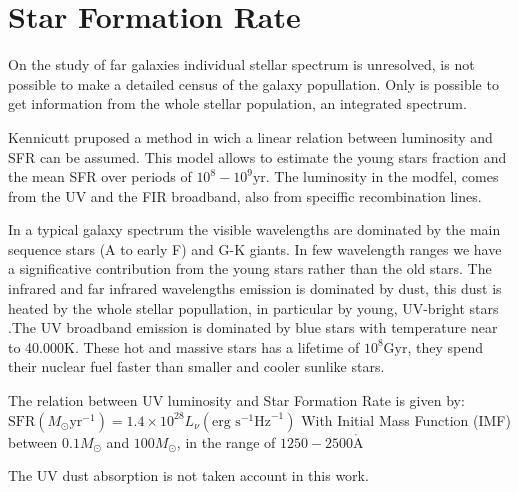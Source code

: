 \section{Star Formation Rate}

On the study of far galaxies individual stellar spectrum is unresolved, is not 
possible to make a detailed census of the galaxy popullation. Only is possible 
to get information from the whole stellar population, an integrated spectrum.

Kennicutt pruposed a method in wich a linear relation between luminosity and 
SFR can be assumed. This model allows to estimate the young stars fraction and 
the mean SFR over periods of $10^8 - 10^9 \textrm{yr}$. The luminosity in the 
modfel, comes from the UV and the FIR broadband, also from speciffic 
recombination lines. 

In a typical galaxy spectrum the visible wavelengths are dominated by the main 
sequence stars (A to early F) and G-K giants. In few wavelength ranges we have 
a significative contribution from the young stars rather than the old stars. 
The infrared and far infrared wavelengths emission is dominated by dust, this 
dust is  heated by the whole stellar popullation, in particular by young, 
UV-bright stars \citep{law11}.The UV broadband emission is dominated by blue 
stars with temperature near to 40.000K. These hot and massive stars has a 
lifetime of $10^8\textrm{Gyr}$, they spend their nuclear fuel faster than smaller 
and cooler sunlike stars.

The relation between UV luminosity and Star Formation Rate \citep{kennicutt98} 
is given by:
  $ \textrm{SFR}\left(M_\odot \textrm{yr}^{-1}\right) 
      = 1.4 \times 10^{28} L_{\nu} \left( \textrm{erg s}^{-1}\textrm{Hz}^{-1} 
\right)$
  With Initial Mass Function (IMF) between $0.1 M_\odot$ 
  and $100 M_\odot$, in the range of $1250-2500 \mathring{\textrm{A}} $

The UV dust absorption \citep{kennicutt09} is not taken account in this work.






